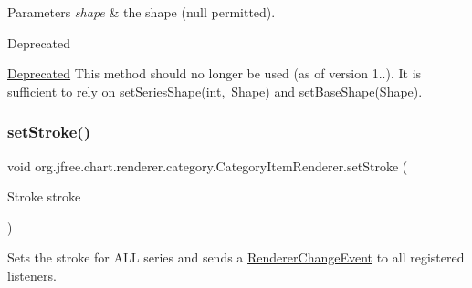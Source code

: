 \begin{DoxyParams}{Parameters}
{\em shape} & the shape ({\ttfamily null} permitted).\\
\hline
\end{DoxyParams}
\begin{DoxyRefDesc}{Deprecated}
\item[\mbox{\hyperlink{deprecated__deprecated000163}{Deprecated}}]This method should no longer be used (as of version 1..). It is sufficient to rely on \mbox{\hyperlink{interfaceorg_1_1jfree_1_1chart_1_1renderer_1_1category_1_1_category_item_renderer_abf0baf3c766531b4be3a3f830d6f4685}{set\+Series\+Shape(int, Shape)}} and \mbox{\hyperlink{interfaceorg_1_1jfree_1_1chart_1_1renderer_1_1category_1_1_category_item_renderer_a239cddb1eab54345044f1a4eb430eb03}{set\+Base\+Shape(\+Shape)}}. \end{DoxyRefDesc}
\mbox{\label{interfaceorg_1_1jfree_1_1chart_1_1renderer_1_1category_1_1_category_item_renderer_a5c1687a1dd15aa18ea1dd2b27c84888e}} 
\subsubsection{\texorpdfstring{set\+Stroke()}{setStroke()}}
{\footnotesize\ttfamily void org.\+jfree.\+chart.\+renderer.\+category.\+Category\+Item\+Renderer.\+set\+Stroke (\begin{DoxyParamCaption}\item[{Stroke}]{stroke }\end{DoxyParamCaption})}

Sets the stroke for A\+LL series and sends a \mbox{\hyperlink{}{Renderer\+Change\+Event}} to all registered listeners.



